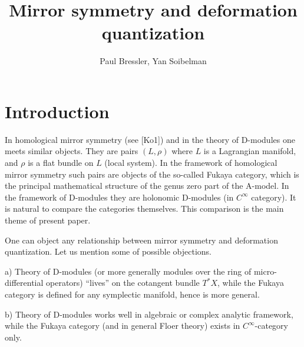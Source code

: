 \documentclass[a4paper,12pt]{article}
\title{Mirror symmetry and deformation quantization}
\author {Paul Bressler, Yan Soibelman}
\begin{document}
\maketitle


\newtheorem{thm}{Theorem}
\newtheorem{lmm}{Lemma}
\newtheorem{dfn}{Definition}
\newtheorem{rmk}{Remark}
\newtheorem{prp}{Proposition}
\newtheorem{conj}{Conjecture}
\newtheorem{exa}{Example}
\newtheorem{cor}{Corollary}
\newtheorem{que}{Question}
\newtheorem{ack}{Acknowledgements}
\newcommand{\K}{{\bf k}}
\newcommand{\C}{{\bf C}}
\newcommand{\R}{{\bf R}}
\newcommand{\N}{{\bf N}}
\newcommand{\Z}{{\bf Z}}
\newcommand{\Q}{{\bf Q}}
\newcommand{\G}{\Gamma}
\newcommand{\A}{A_{\infty}}
\newcommand{\ihom}{\underline{\Hom}}
\newcommand{\ra}{\longrightarrow}
\newcommand{\epi}{\twoheadrightarrow}
\newcommand{\mono}{\hookrightarrow}

\newcommand{\epp}{\varepsilon}



\vspace{3mm}


\section{Introduction}





In homological mirror symmetry (see [Ko1]) and in the theory of D-modules  one meets
similar objects. They are pairs $(L,\rho)$ where $L$ is a Lagrangian
manifold, and $\rho$ is a flat bundle on $L$ (local system).
In the framework of homological mirror symmetry such pairs
are objects of the so-called Fukaya category, which
is the principal mathematical structure of the genus zero part of the A-model.
In the framework
of D-modules they are holonomic D-modules (in $C^{\infty}$ category).
It is natural to compare the categories themselves.
This comparison is the main theme of  present paper.

One can object any relationship between mirror symmetry and deformation
quantization. Let us mention some of possible objections.

a) Theory of D-modules (or more generally modules
over the ring of micro-differential operators) ``lives''
on the cotangent bundle $T^{\ast}X$, while the Fukaya
category is defined for any symplectic manifold, hence is more general.

b) Theory of D-modules works well in algebraic or complex
analytic framework, while the Fukaya category (and in general
Floer theory) exists in $C^{\infty}$-category only.
\end{document}

